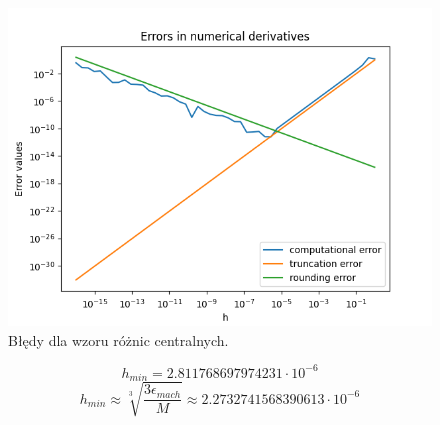 \documentclass[11pt]{scrartcl}
\begin{document}
    \begin{figure}[H]
        \centering
        \includegraphics[width=0.8\linewidth]{Figure_2.png}
        \caption{Błędy dla wzoru różnic centralnych.}
    \end{figure}
    \[
        h_{min}=2.811768697974231 \cdot 10^{-6}
    \]
    \[
        h_{min} \approx \sqrt[3]{\frac{3\epsilon_{mach}}{M}} \approx
        2.2732741568390613 \cdot 10^{-6}
    \]
\end{document}
